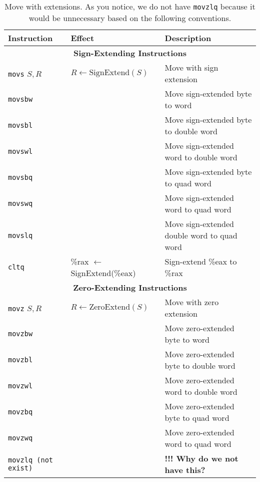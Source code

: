 \begin{table}[t] 
    \centering
    \small
    \renewcommand{\arraystretch}{1.1}
    \begin{tabular}{l l l}
        \toprule
        \textbf{Instruction} & \textbf{Effect} & \textbf{Description} \\
        \midrule
        \multicolumn{3}{c}{\textbf{Sign-Extending Instructions}} \\
        \midrule
        \texttt{movs} $S, R$  & $R \leftarrow \text{SignExtend}(S)$ & Move with sign extension \\
        \texttt{movsbw} &  & Move sign-extended byte to word \\
        \texttt{movsbl} &  & Move sign-extended byte to double word \\
        \texttt{movswl} &  & Move sign-extended word to double word \\
        \texttt{movsbq} &  & Move sign-extended byte to quad word \\
        \texttt{movswq} &  & Move sign-extended word to quad word \\
        \texttt{movslq} &  & Move sign-extended double word to quad word \\
        \texttt{cltq}   & \%rax $\leftarrow$ SignExtend(\%eax) & Sign-extend \%eax to \%rax \\
        \midrule
        \midrule 
        \multicolumn{3}{c}{\textbf{Zero-Extending Instructions}} \\
        \midrule
        \texttt{movz} $S, R$  & $R \leftarrow \text{ZeroExtend}(S)$ & Move with zero extension \\
        \texttt{movzbw} &  & Move zero-extended byte to word \\
        \texttt{movzbl} &  & Move zero-extended byte to double word \\
        \texttt{movzwl} &  & Move zero-extended word to double word \\
        \texttt{movzbq} &  & Move zero-extended byte to quad word \\
        \texttt{movzwq} &  & Move zero-extended word to quad word \\
        \texttt{movzlq (not exist)} &  & \textbf{!!! Why do we not have this?} \\
        \bottomrule
    \end{tabular}
    \caption{Move with extensions. As you notice, we do not have \texttt{movzlq} 
    because it would be unnecessary based on the following conventions.}
\end{table}
